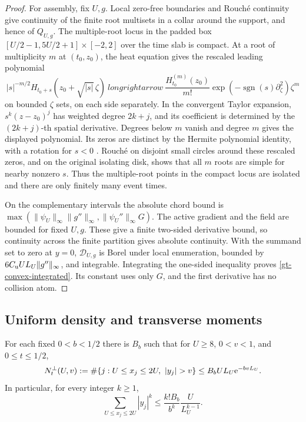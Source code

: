 \begin{proof}
For assembly, fix \(U,g\). Local zero-free boundaries and Rouch\'e
continuity give continuity of the finite root multisets in a collar
around the support, and hence of \(Q_{U,g}\). The multiple-root locus
in the padded box \([U/2-1,5U/2+1]\times[-2,2]\) over the time slab
is compact. At a root of multiplicity \(m\) at \((t_0,z_0)\), the heat
equation gives the rescaled leading polynomial
\[
 |s|^{-m/2}H_{t_0+s}(z_0+\sqrt{|s|}\,\zeta)
 \ longrightarrow\ 
 \frac{H_{t_0}^{(m)}(z_0)}{m!}
     \exp(-\operatorname{sgn}(s)\partial_\zeta^2)\zeta^m
\]
on bounded \(\zeta\) sets, on each side separately. In the convergent
Taylor expansion, \(s^k(z-z_0)^j\) has weighted degree \(2k+j\),
and its coefficient is determined by the \((2k+j)\)-th spatial
derivative. Degrees below \(m\) vanish and degree \(m\) gives the
displayed polynomial. Its zeros are distinct by the Hermite polynomial
identity, with a rotation for \(s<0\)
\cite[Proposition~3.1(ii)]{polymath}. Rouch\'e on disjoint small circles
around these rescaled zeros, and on the original isolating disk,
shows that all \(m\) roots are simple for nearby nonzero \(s\).
Thus the multiple-root points in the compact locus are isolated and
there are only finitely many event times.

On the complementary intervals the absolute chord bound is
\(\max(\|\psi_U\|_\infty\|g''\|_\infty,\|\psi_U''\|_\infty G)\).
The active gradient and the field are bounded for fixed \(U,g\).
These give a finite two-sided derivative bound, so continuity across
the finite partition gives absolute continuity. With the summand set
to zero at \(y=0\), \(\mathcal D_{U,g}\) is Borel under local enumeration,
bounded by \(6C_{\rm u}UL_U\|g''\|_\infty\), and integrable. Integrating
the one-sided inequality proves \eqref{gt-convex-integrated}. Its
constant uses only \(G\), and the first derivative has no collision
atom.
\end{proof}

\subsection{Uniform density and transverse moments}

\begin{theorem}
\label{gt-transverse-density}
For each fixed \(0<b<1/2\) there is \(B_b\) such that for \(U\ge8\),
\(0<v<1\), and \(0\le t\le1/2\),
\begin{equation}
 N_t^\perp(U,v):=\#\{j: U\le x_j\le2U,\ |y_j|>v\}
 \le B_b U L_U\e^{-bvL_U}.
 \label{gt-density-dyadic}
\end{equation}
In particular, for every integer \(k\ge1\),
\begin{equation}
 \sum_{U\le x_j\le2U}|y_j|^k
 \le \frac{k! B_b}{b^k}\frac{U}{L_U^{k-1}}.
 \label{gt-transverse-moments}
\end{equation}
\end{theorem}

